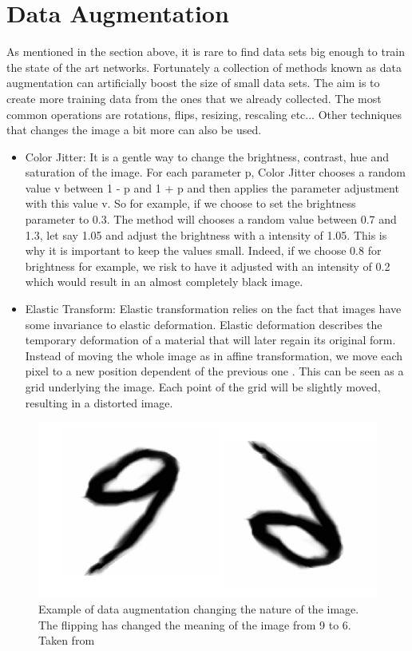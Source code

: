 \section{Data Augmentation} \label{sec:dataug}
As mentioned in the section above, it is rare to find data sets big enough to train the state of the art networks. Fortunately a collection of methods known as data augmentation can artificially boost the size of small data sets. The aim is to create more training data from the ones that we already collected. The most common operations are rotations, flips, resizing, rescaling etc... Other techniques that changes the image a bit more can also be used.
\begin{itemize}
    \item Color Jitter: It is a gentle way to change the brightness, contrast, hue and saturation of the image. 
    For each parameter p, Color Jitter chooses a random value v between 1 - p and 1 + p and then applies the parameter adjustment with this value v. So for example, if we choose to set the brightness parameter to 0.3. The method will chooses a random value between 0.7 and 1.3, let say 1.05 and adjust the brightness with a intensity of 1.05. This is why it is important to keep the values small. Indeed, if we choose 0.8 for brightness for example, we risk to have it adjusted with an intensity of 0.2 which would result in an almost completely black image.
     \item Elastic Transform:   Elastic transformation relies on the fact  that images have some invariance to elastic deformation. Elastic deformation describes the temporary deformation of a material that will later regain its original form. Instead of moving the whole image as in affine transformation, we move each pixel to a new position dependent of the previous one \cite{elastic}. This can be seen as a grid underlying the image. Each point of the grid will be slightly moved, resulting in a distorted image. 
     \end{itemize}

\begin{figure}[!htp]
    \centering
        \includegraphics[width=1\textwidth]{figures/02-badaug}
        \caption[Data Augmentation Limitations]{Example of data augmentation changing the nature of the image. The flipping has changed the meaning of the image from 9 to 6. Taken from \cite{badaug_im}}\label{fig:badaug}
\end{figure}
     
